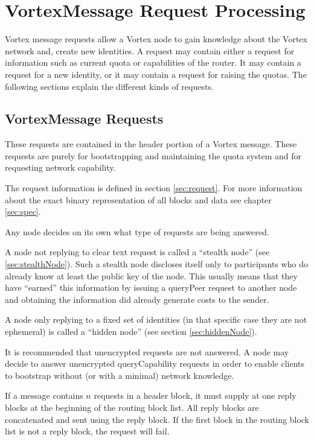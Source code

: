 \section{VortexMessage Request Processing}
Vortex message requests allow a Vortex node to gain knowledge about the Vortex network and, create new identities. A request may contain either a request for information such as current quota or capabilities of the router. It may contain a request for a new identity, or it may contain a request for raising the quotas. The following sections explain the different kinds of requests.

\subsection{VortexMessage Requests}
These requests are contained in the header portion of a Vortex message. These requests are purely for bootstrapping and maintaining the quota system and for requesting network capability.

The request information is defined in section \ref{sec:request}. For more information about the exact binary representation of all blocks and data see chapter \ref{sec:spec}.

Any node decides on its own what type of requests are being answered. 

A node not replying to clear text request is called a ``stealth node'' (see \ref{sec:stealthNode}). Such a stealth node discloses itself only to participants who do already know at least the public key of the node. This usually means that they have ``earned'' this information by issuing a queryPeer request to another node and obtaining the information did already generate costs to the sender.

A node only replying to a fixed set of identities (in that specific case they are not ephemeral) is called a ``hidden node'' (see section \ref{sec:hiddenNode}).

It is recommended that unencrypted requests are not answered. A node may decide to answer unencrypted queryCapability requests in order to enable clients to bootstrap without (or with a minimal) network knowledge.

If a message contains $n$ requests in a header block, it must supply at one reply blocks at the beginning of the routing block list. All reply blocks are concatenated and sent using the reply block. If the first block in the routing block list is not a reply block, the request will fail.

